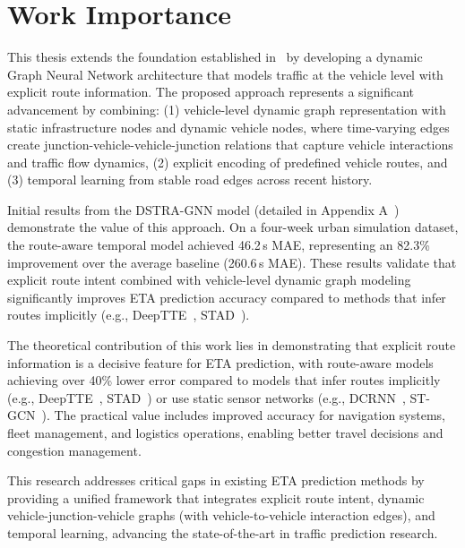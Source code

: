 \section{Work Importance}

This thesis extends the foundation established in~\cite{voloch2021,SmartSimulativeRoute2025} by developing a dynamic Graph Neural Network architecture that models traffic at the vehicle level with explicit route information. The proposed approach represents a significant advancement by combining: (1) vehicle-level dynamic graph representation with static infrastructure nodes and dynamic vehicle nodes, where time-varying edges create junction-vehicle-vehicle-junction relations that capture vehicle interactions and traffic flow dynamics, (2) explicit encoding of predefined vehicle routes, and (3) temporal learning from stable road edges across recent history.

Initial results from the DSTRA-GNN model (detailed in Appendix A~\cite{Tordjman2025DSTRA}) demonstrate the value of this approach. On a four-week urban simulation dataset, the route-aware temporal model achieved 46.2\,s MAE, representing an 82.3\% improvement over the average baseline (260.6\,s MAE). These results validate that explicit route intent combined with vehicle-level dynamic graph modeling significantly improves ETA prediction accuracy compared to methods that infer routes implicitly (e.g., DeepTTE~\cite{deepTTE2018}, STAD~\cite{abbar2020stad}).

The theoretical contribution of this work lies in demonstrating that explicit route information is a decisive feature for ETA prediction, with route-aware models achieving over 40\% lower error compared to models that infer routes implicitly (e.g., DeepTTE~\cite{deepTTE2018}, STAD~\cite{abbar2020stad}) or use static sensor networks (e.g., DCRNN~\cite{dcrnn2018}, ST-GCN~\cite{yu2018stgcn}). The practical value includes improved accuracy for navigation systems, fleet management, and logistics operations, enabling better travel decisions and congestion management.

This research addresses critical gaps in existing ETA prediction methods by providing a unified framework that integrates explicit route intent, dynamic vehicle-junction-vehicle graphs (with vehicle-to-vehicle interaction edges), and temporal learning, advancing the state-of-the-art in traffic prediction research.


